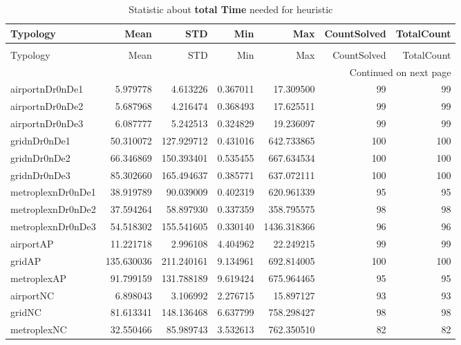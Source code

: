 \documentclass[../../../thesis.tex]{subfiles}
\begin{document}
\begin{longtable}{|l|r|r|r|r|r|r|}
\caption{Statistic about \textbf{total Time} needed for heuristic} \label{table:heuristic:totalTime} \\ \hline

Typology & Mean & STD & Min & Max & CountSolved & TotalCount \\ \hline

\endfirsthead
\caption[]{Statistic about \textbf{total Time} needed for heuristic} \\ \hline

Typology & Mean & STD & Min & Max & CountSolved & TotalCount \\ \hline

\endhead

\multicolumn{7}{r}{Continued on next page} \\ \hline

\endfoot

\endlastfoot
airportnDr0nDe1 & 5.979778 & 4.613226 & 0.367011 & 17.309500 & 99 & 99 \\ \hline
airportnDr0nDe2 & 5.687968 & 4.216474 & 0.368493 & 17.625511 & 99 & 99 \\ \hline
airportnDr0nDe3 & 6.087777 & 5.242513 & 0.324829 & 19.236097 & 99 & 99 \\ \hline
gridnDr0nDe1 & 50.310072 & 127.929712 & 0.431016 & 642.733865 & 100 & 100 \\ \hline
gridnDr0nDe2 & 66.346869 & 150.393401 & 0.535455 & 667.634534 & 100 & 100 \\ \hline
gridnDr0nDe3 & 85.302660 & 165.494637 & 0.385771 & 637.072111 & 100 & 100 \\ \hline
metroplexnDr0nDe1 & 38.919789 & 90.039009 & 0.402319 & 620.961339 & 95 & 95 \\ \hline
metroplexnDr0nDe2 & 37.594264 & 58.897930 & 0.337359 & 358.795575 & 98 & 98 \\ \hline
metroplexnDr0nDe3 & 54.518302 & 155.541605 & 0.330140 & 1436.318366 & 96 & 96 \\ \hline
airportAP & 11.221718 & 2.996108 & 4.404962 & 22.249215 & 99 & 99 \\ \hline
gridAP & 135.630036 & 211.240161 & 9.134961 & 692.814005 & 100 & 100 \\ \hline
metroplexAP & 91.799159 & 131.788189 & 9.619424 & 675.964465 & 95 & 95 \\ \hline
airportNC & 6.898043 & 3.106992 & 2.276715 & 15.897127 & 93 & 93 \\ \hline
gridNC & 81.613341 & 148.136468 & 6.637799 & 758.298427 & 98 & 98 \\ \hline
metroplexNC & 32.550466 & 85.989743 & 3.532613 & 762.350510 & 82 & 82 \\ \hline
\end{longtable}
\end{document}
